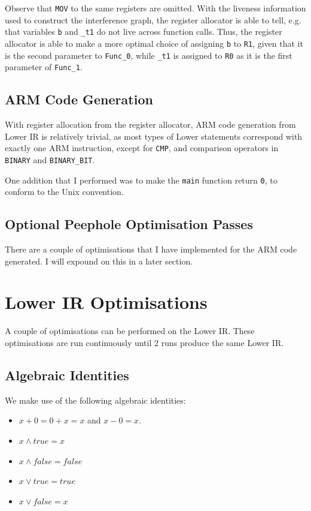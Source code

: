 \documentclass[nonacm, acmsmall, screen, 10pt]{acmart}
\begin{document}
Observe that \texttt{MOV} to the same registers are omitted.
With the liveness information used to construct the interference graph, the register allocator is able to tell, e.g. that variables \texttt{b} and \texttt{\_t1} do not live across function calls.
Thus, the register allocator is able to make a more optimal choice of assigning \texttt{b} to \texttt{R1}, given that it is the second parameter to \texttt{Func\_0}, while \texttt{\_t1} is assigned to \texttt{R0} as it is the first parameter of \texttt{Func\_1}.

\subsection{ARM Code Generation}
With register allocation from the register allocator, ARM code generation from Lower IR is relatively trivial, as most types of Lower statements correspond with exactly one ARM instruction, except for \texttt{CMP}, and comparison operators in \texttt{BINARY} and \texttt{BINARY\_BIT}.

One addition that I performed was to make the \texttt{main} function return \texttt{0}, to conform to the Unix convention.

\subsection{Optional Peephole Optimisation Passes}
There are a couple of optimisations that I have implemented for the ARM code generated.
I will expound on this in a later section.

\section{Lower IR Optimisations}
A couple of optimisations can be performed on the Lower IR.
These optimisations are run continuously until 2 runs produce the same Lower IR.

\subsection{Algebraic Identities}
We make use of the following algebraic identities:
\begin{itemize}
  \item $x + 0 = 0 + x = x$ and $x - 0 = x$.
  \item $x \land true = x$
  \item $x \land false = false$
  \item $x \lor true = true$
  \item $x \lor false = x$
\end{itemize}
\end{document}
